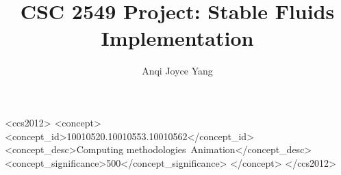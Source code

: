 \documentclass[sigconf]{acmart}
\begin{document}
\title{CSC 2549 Project: Stable Fluids Implementation}

\author{Anqi Joyce Yang}

\begin{CCSXML}
<ccs2012>
 <concept>
  <concept_id>10010520.10010553.10010562</concept_id>
  <concept_desc>Computing methodologies~Animation</concept_desc>
  <concept_significance>500</concept_significance>
 </concept>
</ccs2012>
\end{CCSXML}



\end{document}
